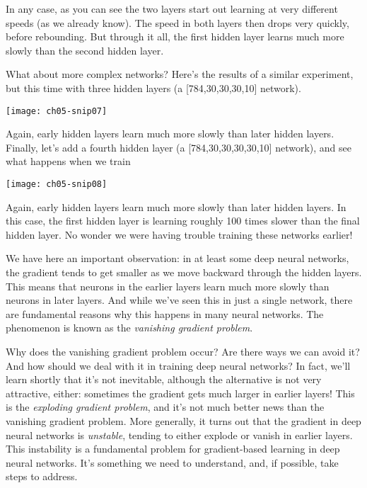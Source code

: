 In any case, as you can see the two layers start out learning at very different speeds (as we already know). The speed in both layers then drops very quickly, before rebounding. But through it all, the first hidden layer learns much more slowly than the second hidden layer.

What about more complex networks? Here's the results of a similar experiment, but this time with three hidden layers (a [784,30,30,30,10] network).
\begin{marginfigure}
    \texttt{[image: ch05-snip07]}
    \end{marginfigure}

Again, early hidden layers learn much more slowly than later hidden layers. Finally, let's add a fourth hidden layer (a [784,30,30,30,30,10] network), and see what happens when we train
\begin{marginfigure}
    \texttt{[image: ch05-snip08]}
    \end{marginfigure}

Again, early hidden layers learn much more slowly than later hidden layers. In this case, the first hidden layer is learning roughly 100 times slower than the final hidden layer. No wonder we were having trouble training these networks earlier!

We have here an important observation: in at least some deep neural networks, the gradient tends to get smaller as we move backward through the hidden layers. This means that neurons in the earlier layers learn much more slowly than neurons in later layers. And while we've seen this in just a single network, there are fundamental reasons why this happens in many neural networks. The phenomenon is known as the \textit{vanishing gradient problem}.

Why does the vanishing gradient problem occur? Are there ways we can avoid it? And how should we deal with it in training deep neural networks? In fact, we'll learn shortly that it's not inevitable, although the alternative is not very attractive, either: sometimes the gradient gets much larger in earlier layers! This is the \textit{exploding gradient problem}, and it's not much better news than the vanishing gradient problem. More generally, it turns out that the gradient in deep neural networks is \textit{unstable}, tending to either explode or vanish in earlier layers. This instability is a fundamental problem for gradient-based learning in deep neural networks. It's something we need to understand, and, if possible, take steps to address.

